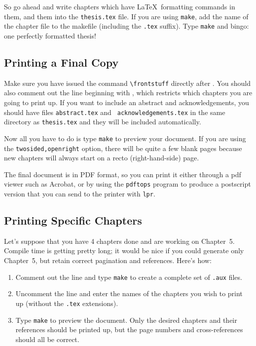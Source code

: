 So go ahead and write chapters which have \LaTeX\ formatting commands
in them, and \verb|| them into the {\tt thesis.tex} file.
If you are using \verb|make|, add the name of the chapter file to the
makefile (including the \verb|.tex| suffix). Type {\tt make} and
bingo: one perfectly formatted thesis!

\subsection{Printing a Final Copy}
Make sure you have issued the command \verb|\frontstuff| directly
after \verb||.  You should also comment out the line
beginning with \verb||, which restricts which chapters
you are going to print up.  If you want to include an abstract and
acknowledgements, you should have files {\tt abstract.tex} and {\tt
acknowledgements.tex} in the same directory as {\tt thesis.tex} and
they will be included automatically.

Now all you have to do is type {\tt make} to preview your document.
If you are using the {\tt twosided,openright} option,
there will be quite a few blank pages because new chapters will always
start on a recto (right-hand-side) page.

The final document is in PDF format, so you can print it either
through a pdf viewer such as Acrobat, or by using the \verb|pdftops|
program to produce a postscript version that you can send to the
printer with \verb|lpr|.

\subsection{Printing Specific Chapters}
Let's suppose that you have 4 chapters done and are working on
Chapter~5.  Compile time is getting pretty long; it would be nice if
you could generate only Chapter~5, but retain correct pagination and
references.  Here's how:
\begin{enumerate}
\item Comment out the \verb|| line and type {\tt make} to
create a complete set of {\tt .aux} files.
\item Uncomment the \verb|| line and enter the names of
the chapter{s} you wish to print up (without the {\tt .tex} extensions).
\item Type {\tt make} to preview the document.  Only the
desired chapters and their references should be printed up, but the
page numbers and cross-references should all be correct.
\end{enumerate}

